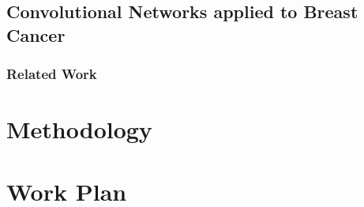\documentclass[11pt]{article}
\begin{document}
	\subsection{Convolutional Networks applied to Breast Cancer}
	\label{subsec:BreastCancerConvNets}	

	\subsubsection{Related Work}
	

\section{Methodology}
\label{sec:Methodology}


\section{Work Plan}
\label{sec:WorkPlan}




\end{document}

